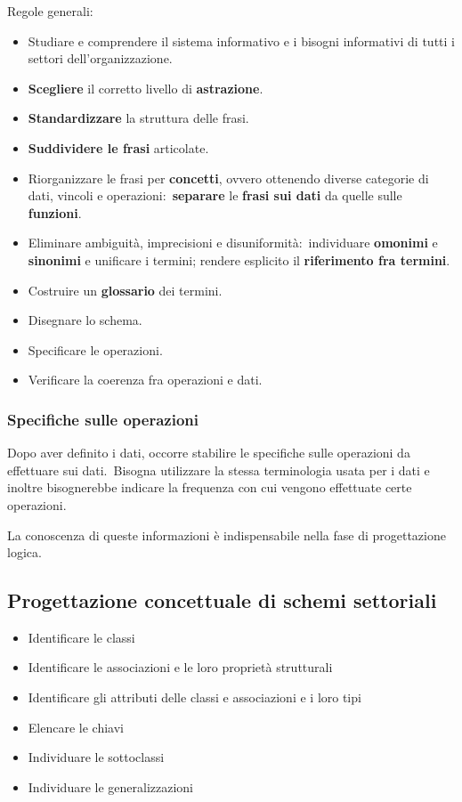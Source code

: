 \noindent Regole generali:
\begin{itemize}
	\item Studiare e comprendere il sistema informativo e i bisogni informativi di tutti i settori dell'organizzazione.
	\item \textbf{Scegliere} il corretto livello di \textbf{astrazione}.
	\item \textbf{Standardizzare} la struttura delle frasi.
	\item \textbf{Suddividere le frasi} articolate.
	\item Riorganizzare le frasi per \textbf{concetti}, ovvero ottenendo diverse categorie di dati, vincoli e operazioni:\ \textbf{separare} le \textbf{frasi sui dati} da quelle sulle \textbf{funzioni}.
	\item Eliminare ambiguità, imprecisioni e disuniformità:\ individuare \textbf{omonimi} e \textbf{sinonimi} e unificare i termini; rendere esplicito il \textbf{riferimento fra termini}.
	\item Costruire un \textbf{glossario} dei termini.
	\item Disegnare lo schema.
	\item Specificare le operazioni.
	\item Verificare la coerenza fra operazioni e dati.
\end{itemize}

\subsubsection{Specifiche sulle operazioni}

Dopo aver definito i dati, occorre stabilire le specifiche sulle operazioni da effettuare sui dati.\
Bisogna utilizzare la stessa terminologia usata per i dati e inoltre bisognerebbe indicare la frequenza con cui vengono effettuate certe operazioni.\

La conoscenza di queste informazioni è indispensabile nella fase di progettazione logica.

\subsection{Progettazione concettuale di schemi settoriali}
\begin{itemize}
	\item Identificare le classi
	\item Identificare le associazioni e le loro proprietà strutturali
	\item Identificare gli attributi delle classi e associazioni e i loro tipi
	\item Elencare le chiavi
	\item Individuare le sottoclassi
	\item Individuare le generalizzazioni
\end{itemize}


